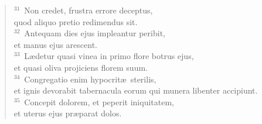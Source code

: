 \begin{flushleft}
\begin{verse}
${}^{31}$~Non credet, frustra errore deceptus,\\ quod aliquo pretio redimendus sit.\\
${}^{32}$~Antequam dies ejus impleantur peribit,\\ et manus ejus arescent.\\
${}^{33}$~L\ae detur quasi vinea in primo flore botrus ejus,\\ et quasi oliva projiciens florem suum.\\
${}^{34}$~Congregatio enim hypocrit\ae\ sterilis,\\ et ignis devorabit tabernacula eorum qui munera libenter accipiunt.\\
${}^{35}$~Concepit dolorem, et peperit iniquitatem,\\ et uterus ejus pr\ae parat dolos.\end{verse}\end{flushleft}


